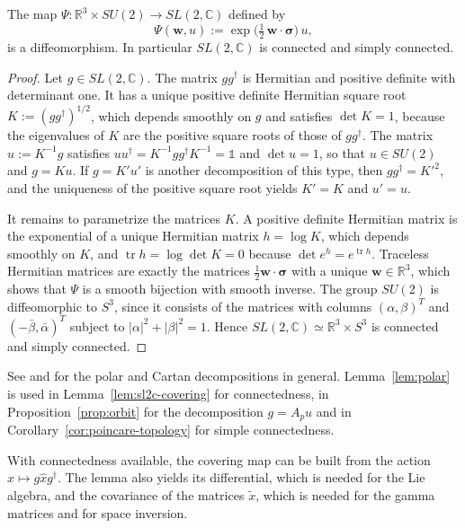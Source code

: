 \begin{lemma}\label{lem:polar}
	The map $\Psi:\mathbb{R}^3\times SU(2)\to SL(2,\mathbb{C})$ defined by
	\begin{equation}
		\Psi(\mathbf{w},u):=\exp\!\big(\tfrac12\,\mathbf{w}\cdot\boldsymbol{\sigma}\big)\,u,
	\end{equation}
	is a diffeomorphism. In particular $SL(2,\mathbb{C})$ is connected and simply connected.
\end{lemma}

\begin{proof}
	Let $g\in SL(2,\mathbb{C})$. The matrix $gg^\dagger$ is Hermitian and positive definite with determinant one. It has a unique positive definite Hermitian square root $K:=(gg^\dagger)^{1/2}$, which depends smoothly on $g$ and satisfies $\det K=1$, because the eigenvalues of $K$ are the positive square roots of those of $gg^\dagger$. The matrix $u:=K^{-1}g$ satisfies $uu^\dagger=K^{-1}gg^\dagger K^{-1}=\mathbb{1}$ and $\det u=1$, so that $u\in SU(2)$ and $g=Ku$. If $g=K'u'$ is another decomposition of this type, then $gg^\dagger=K'^2$, and the uniqueness of the positive square root yields $K'=K$ and $u'=u$.
	
	It remains to parametrize the matrices $K$. A positive definite Hermitian matrix is the exponential of a unique Hermitian matrix $h=\log K$, which depends smoothly on $K$, and $\operatorname{tr}h=\log\det K=0$ because $\det e^h=e^{\operatorname{tr}h}$. Traceless Hermitian matrices are exactly the matrices $\tfrac12\mathbf{w}\cdot\boldsymbol{\sigma}$ with a unique $\mathbf{w}\in\mathbb{R}^3$, which shows that $\Psi$ is a smooth bijection with smooth inverse. The group $SU(2)$ is diffeomorphic to $S^3$, since it consists of the matrices with columns $(\alpha,\beta)^T$ and $(-\bar\beta,\bar\alpha)^T$ subject to $|\alpha|^2+|\beta|^2=1$. Hence $SL(2,\mathbb{C})\simeq\mathbb{R}^3\times S^3$ is connected and simply connected.
\end{proof}

\noindent See \cite[TODO-location]{TODO-Hal03} and \cite[Chapter 3, \S6]{TODO-BarutRaczka} for the polar and Cartan decompositions in general. Lemma~\ref{lem:polar} is used in Lemma~\ref{lem:sl2c-covering} for connectedness, in Proposition~\ref{prop:orbit} for the decomposition $g=A_pu$ and in Corollary~\ref{cor:poincare-topology} for simple connectedness.

With connectedness available, the covering map can be built from the action $\hat{x}\mapsto g\hat{x}g^\dagger$. The lemma also yields its differential, which is needed for the Lie algebra, and the covariance of the matrices $\tilde{x}$, which is needed for the gamma matrices and for space inversion.

